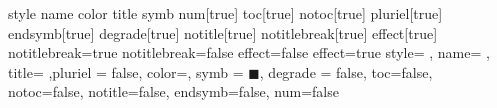 \def\couleur{black}




 {style}{}
 {name}{}
 {color}{}
 {title}{}
 {symb}{}
 {num}[true]{} %
 {toc}[true]{} 
 {notoc}[true]{} 
 {pluriel}[true]{} 
 {endsymb}[true]{} 
 {degrade}[true]{} 
 {notitle}[true]{} 
 {notitlebreak}[true]{}
 {effect}[true]{}
\if@notitlebreak
	 {notitlebreak=true}{}
\else
	 {notitlebreak=false}{}
\fi
\if@noeffect
	 {effect=false}{}
\else
	 {effect=true}{}
\fi
{} {style= , name= , title= ,pluriel = false, color=, symb = $\blacksquare$, degrade = false, toc=false, notoc=false, notitle=false, endsymb=false, num=false}{}

\newcommand*{\env}[1][]{\pasEnv[#1]}

